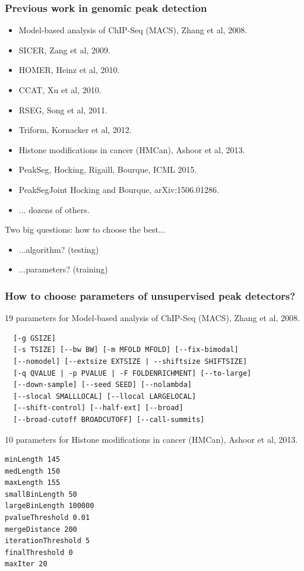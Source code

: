 \documentclass{beamer}
\begin{document}
\begin{frame}
  \frametitle{Previous work in genomic peak detection}
  \begin{itemize}
  \item Model-based analysis of ChIP-Seq (MACS), Zhang et al, 2008.
  \item SICER, Zang et al, 2009.
  \item HOMER, Heinz et al, 2010.
  \item CCAT, Xu et al, 2010.
  \item RSEG, Song et al, 2011.
  \item Triform, Kornacker et al, 2012.
  \item Histone modifications in cancer (HMCan), Ashoor et al, 2013.
  \item PeakSeg, Hocking, Rigaill, Bourque, ICML 2015.
  \item PeakSegJoint Hocking and Bourque, arXiv:1506.01286.
  \item ... dozens of others.
  \end{itemize}
  Two big questions: how to choose the best...
  \begin{itemize}
  \item ...algorithm? (testing)
  \item \alert<1>{...parameters? (training)}
  \end{itemize}
\end{frame}

\begin{frame}[fragile]
  \frametitle{How to choose parameters of unsupervised peak
    detectors?}
\scriptsize
19 parameters for Model-based analysis of ChIP-Seq (MACS), Zhang et al, 2008.
\begin{verbatim}
  [-g GSIZE]
  [-s TSIZE] [--bw BW] [-m MFOLD MFOLD] [--fix-bimodal]
  [--nomodel] [--extsize EXTSIZE | --shiftsize SHIFTSIZE]
  [-q QVALUE | -p PVALUE | -F FOLDENRICHMENT] [--to-large]
  [--down-sample] [--seed SEED] [--nolambda]
  [--slocal SMALLLOCAL] [--llocal LARGELOCAL]
  [--shift-control] [--half-ext] [--broad]
  [--broad-cutoff BROADCUTOFF] [--call-summits]
\end{verbatim}
10 parameters for Histone modifications in cancer (HMCan),
Ashoor et al, 2013.
\begin{verbatim}
minLength 145
medLength 150
maxLength 155
smallBinLength 50
largeBinLength 100000
pvalueThreshold 0.01
mergeDistance 200
iterationThreshold 5
finalThreshold 0
maxIter 20
\end{verbatim}
\end{frame}
\end{document}
